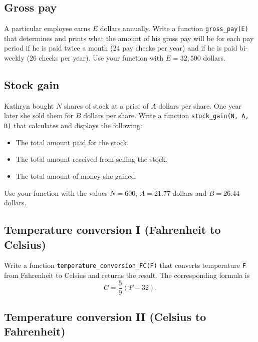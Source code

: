 
\subsection{Gross pay}

A particular employee earns $E$ dollars annually. Write a function 
{\tt gross\_pay(E)} that determines and prints what the amount of his gross pay will be for each pay period 
if he is paid twice a month (24 pay checks per year) and if he is paid bi-weekly (26 checks per 
year). Use your function with $E = 32,500$ dollars.


\subsection{Stock gain}

Kathryn bought $N$ shares of stock at a price of $A$ dollars per share. One year later she 
sold them for $B$ dollars per share. Write a function {\tt stock\_gain(N, A, B)} that calculates and 
displays the following:
\begin{itemize}
\item The total amount paid for the stock.
\item The total amount received from selling the stock.
\item The total amount of money she gained.
\end{itemize}
Use your function with the values $N = 600$, $A = 21.77$ dollars and $B = 26.44$ dollars.


\subsection{Temperature conversion I (Fahrenheit to Celsius)}

Write a function {\tt temperature\_conversion\_FC(F)} that converts 
temperature {\tt F} from Fahrenheit to Celsius and returns the
result. The corresponding formula is 
$$
C = \frac{5}{9}(F - 32).
$$


\subsection{Temperature conversion II (Celsius to Fahrenheit)}

